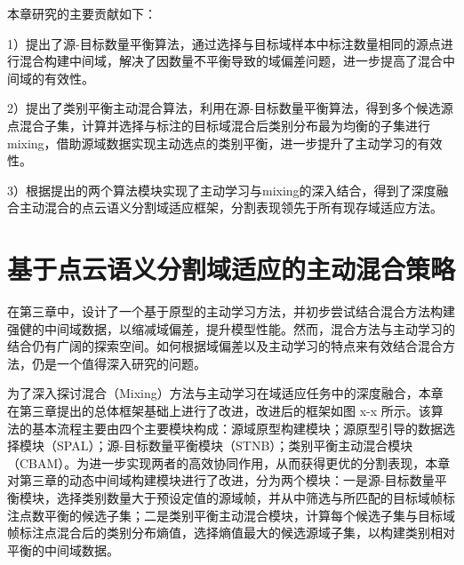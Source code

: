     
    本章研究的主要贡献如下：

    1）提出了源-目标数量平衡算法，通过选择与目标域样本中标注数量相同的源点进行混合构建中间域，解决了因数量不平衡导致的域偏差问题，进一步提高了混合中间域的有效性。

    2）提出了类别平衡主动混合算法，利用在源-目标数量平衡算法，得到多个候选源点混合子集，计算并选择与标注的目标域混合后类别分布最为均衡的子集进行mixing，借助源域数据实现主动选点的类别平衡，进一步提升了主动学习的有效性。

    3）根据提出的两个算法模块实现了主动学习与mixing的深入结合，得到了深度融合主动混合的点云语义分割域适应框架，分割表现领先于所有现存域适应方法。


    \section{基于点云语义分割域适应的主动混合策略}
    在第三章中，设计了一个基于原型的主动学习方法，并初步尝试结合混合方法构建强健的中间域数据，以缩减域偏差，提升模型性能。然而，混合方法与主动学习的结合仍有广阔的探索空间。如何根据域偏差以及主动学习的特点来有效结合混合方法，仍是一个值得深入研究的问题。

    为了深入探讨混合（Mixing）方法与主动学习在域适应任务中的深度融合，本章在第三章提出的总体框架基础上进行了改进，改进后的框架如图 x-x 所示。该算法的基本流程主要由四个主要模块构成：源域原型构建模块；源原型引导的数据选择模块（SPAL）；源-目标数量平衡模块（STNB）；类别平衡主动混合模块（CBAM）。为进一步实现两者的高效协同作用，从而获得更优的分割表现，本章对第三章的动态中间域构建模块进行了改进，分为两个模块：一是源-目标数量平衡模块，选择类别数量大于预设定值的源域帧，并从中筛选与所匹配的目标域帧标注点数平衡的候选子集；二是类别平衡主动混合模块，计算每个候选子集与目标域帧标注点混合后的类别分布熵值，选择熵值最大的候选源域子集，以构建类别相对平衡的中间域数据。

